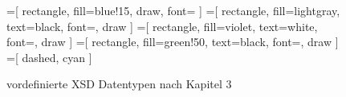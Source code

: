 %
%


\newpage

\begin{figure}[!t]
    \centering
    =[
        rectangle,
        fill={blue!15},
        draw,
        font=\sffamily
    ]      
    =[
        rectangle,
        fill=lightgray,
        text=black,
        font=\sffamily,
        draw
    ]
    =[
        rectangle,
        fill=violet,
        text=white,
        font=\sffamily,
        draw
    ]
    =[
        rectangle,
        fill=green!50,
        text=black,
        font=\sffamily,
        draw
    ]
    =[
        dashed,
        cyan
    ]
    \resizebox{!}{0.92\textheight} {
        \begin{minipage}[b]{0.45\linewidth}
        \end{minipage}
        \hspace{12pt}
        \begin{minipage}[b]{0.45\linewidth}
        \end{minipage}
    }
    \caption{vordefinierte XSD Datentypen nach \cite{XMLSchema11Specification} Kapitel 3}
    \label{fig:xsddatatypes}
\end{figure}